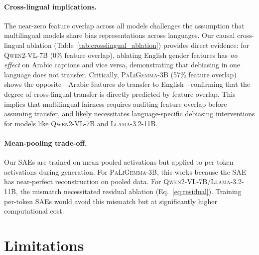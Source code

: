 \documentclass[11pt,a4paper]{article}
\newcommand{\modelname}[1]{\textsc{#1}}
\newcommand{\pali}{\modelname{PaLiGemma-3B}}
\newcommand{\qwen}{\modelname{Qwen2-VL-7B}}
\newcommand{\llama}{\modelname{Llama-3.2-11B}}
\newcommand{\sae}{SAE}
\newcommand{\saes}{SAEs}
\begin{document}
\paragraph{Cross-lingual implications.}
The near-zero feature overlap across all models challenges the assumption that multilingual models share bias representations across languages.
Our causal cross-lingual ablation (Table~\ref{tab:crosslingual_ablation}) provides direct evidence: for \qwen{} (0\% feature overlap), ablating English gender features has \emph{no effect} on Arabic captions and vice versa, demonstrating that debiasing in one language does not transfer.
Critically, \pali{} (57\% feature overlap) shows the opposite---Arabic features \emph{do} transfer to English---confirming that the degree of cross-lingual transfer is directly predicted by feature overlap.
This implies that multilingual fairness requires auditing feature overlap before assuming transfer, and likely necessitates language-specific debiasing interventions for models like \qwen{} and \llama{}.

\paragraph{Mean-pooling trade-off.}
Our \saes{} are trained on mean-pooled activations but applied to per-token activations during generation.
For \pali{}, this works because the \sae{} has near-perfect reconstruction on pooled data.
For \qwen{}/\llama{}, the mismatch necessitated residual ablation (Eq.~\ref{eq:residual}).
Training per-token \saes{} would avoid this mismatch but at significantly higher computational cost.

\section{Limitations}
\label{sec:limitations}
\end{document}
